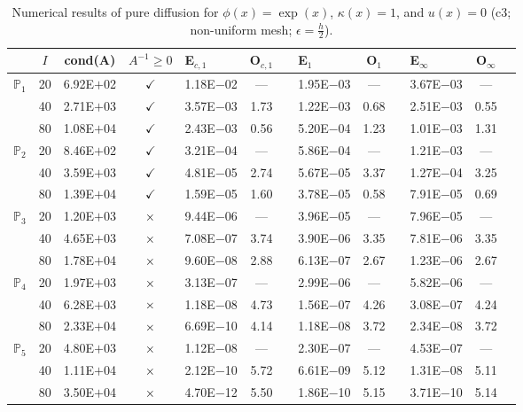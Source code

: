 \begin{table}[H]
\centering
\caption{Numerical results of pure diffusion for $\phi(x)=\exp(x)$, $\kappa(x)=1$, and $u(x)=0$ (c3; non-uniform mesh; $\epsilon=\frac{h}{2}$).}
\begin{tabular}{@{}l c c c l c c l c c l c c@{}}
\toprule
 & $I$ & cond(A) & $A^{-1}\geq 0$ &  E$_{c,1}$ & O$_{c,1}$ && E$_1$ & O$_1$ && E$_{\infty}$ & O$_{\infty}$\\
\midrule
\multirow{3}{*}{$\mathbb{P}_{1}$}
 & 20 & 6.92E$+$02 & $\checkmark$ & 1.18E$-$02 & --- && 1.95E$-$03 & --- && 3.67E$-$03 & ---\\
 & 40 & 2.71E$+$03 & $\checkmark$ & 3.57E$-$03 & 1.73 && 1.22E$-$03 & 0.68 && 2.51E$-$03 & 0.55\\
 & 80 & 1.08E$+$04 & $\checkmark$ & 2.43E$-$03 & 0.56 && 5.20E$-$04 & 1.23 && 1.01E$-$03 & 1.31\\
\midrule
\multirow{3}{*}{$\mathbb{P}_{2}$}
 & 20 & 8.46E$+$02 & $\checkmark$ & 3.21E$-$04 & --- && 5.86E$-$04 & --- && 1.21E$-$03 & ---\\
 & 40 & 3.59E$+$03 & $\checkmark$ & 4.81E$-$05 & 2.74 && 5.67E$-$05 & 3.37 && 1.27E$-$04 & 3.25\\
 & 80 & 1.39E$+$04 & $\checkmark$ & 1.59E$-$05 & 1.60 && 3.78E$-$05 & 0.58 && 7.91E$-$05 & 0.69\\
\midrule
\multirow{3}{*}{$\mathbb{P}_{3}$}
 & 20 & 1.20E$+$03 & $\times$ & 9.44E$-$06 & --- && 3.96E$-$05 & --- && 7.96E$-$05 & ---\\
 & 40 & 4.65E$+$03 & $\times$ & 7.08E$-$07 & 3.74 && 3.90E$-$06 & 3.35 && 7.81E$-$06 & 3.35\\
 & 80 & 1.78E$+$04 & $\times$ & 9.60E$-$08 & 2.88 && 6.13E$-$07 & 2.67 && 1.23E$-$06 & 2.67\\
\midrule
\multirow{3}{*}{$\mathbb{P}_{4}$}
 & 20 & 1.97E$+$03 & $\times$ & 3.13E$-$07 & --- && 2.99E$-$06 & --- && 5.82E$-$06 & ---\\
 & 40 & 6.28E$+$03 & $\times$ & 1.18E$-$08 & 4.73 && 1.56E$-$07 & 4.26 && 3.08E$-$07 & 4.24\\
 & 80 & 2.33E$+$04 & $\times$ & 6.69E$-$10 & 4.14 && 1.18E$-$08 & 3.72 && 2.34E$-$08 & 3.72\\
\midrule
\multirow{3}{*}{$\mathbb{P}_{5}$}
 & 20 & 4.80E$+$03 & $\times$ & 1.12E$-$08 & --- && 2.30E$-$07 & --- && 4.53E$-$07 & ---\\
 & 40 & 1.11E$+$04 & $\times$ & 2.12E$-$10 & 5.72 && 6.61E$-$09 & 5.12 && 1.31E$-$08 & 5.11\\
 & 80 & 3.50E$+$04 & $\times$ & 4.70E$-$12 & 5.50 && 1.86E$-$10 & 5.15 && 3.71E$-$10 & 5.14\\
\bottomrule
\end{tabular}
\end{table}
